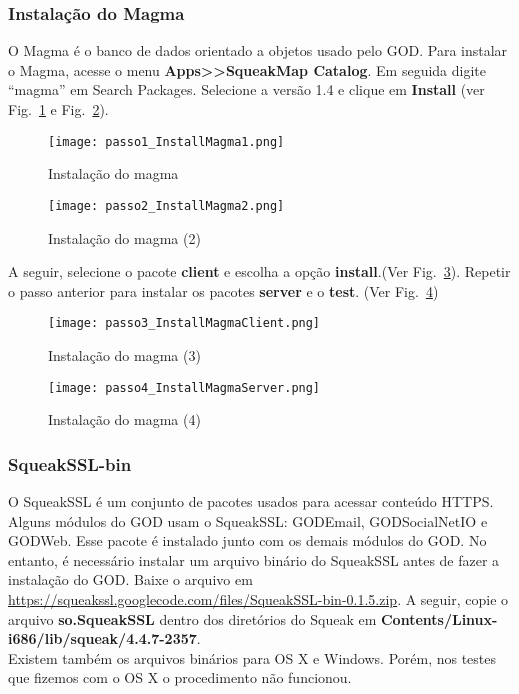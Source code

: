 \subsubsection{Instalação do Magma}
O Magma é o banco de dados orientado a objetos usado pelo GOD. Para instalar o Magma, acesse o menu \textbf{Apps>>SqueakMap Catalog}. Em seguida digite ``magma'' em Search Packages. Selecione a versão 1.4 e clique em \textbf{Install} (ver Fig.~\ref{fig:passo1_InstallMagma1} e Fig.~\ref{fig:passo2_InstallMagma2}).

\begin{figure}[!htb]
\centering
\texttt{[image: passo1\_InstallMagma1.png]}
\caption{Instalação do magma}
\label{fig:passo1_InstallMagma1}
\end{figure}

\begin{figure}[!htb]
\centering
\texttt{[image: passo2\_InstallMagma2.png]}
\caption{Instalação do magma (2)}
\label{fig:passo2_InstallMagma2}
\end{figure}

A seguir, selecione o pacote \textbf{client} e escolha a opção \textbf{install}.(Ver Fig.~\ref{fig:passo3_InstallMagmaClient}). Repetir o passo anterior para instalar os pacotes  \textbf{server} e o \textbf{test}. (Ver Fig.~\ref{fig:passo4_InstallMagmaServer})

\begin{figure}[!htb]
\centering
\texttt{[image: passo3\_InstallMagmaClient.png]}
\caption{Instalação do magma (3)}
\label{fig:passo3_InstallMagmaClient}
\end{figure}

\begin{figure}[!htb]
\centering
\texttt{[image: passo4\_InstallMagmaServer.png]}
\caption{Instalação do magma (4)}
\label{fig:passo4_InstallMagmaServer}
\end{figure}


\subsubsection{SqueakSSL-bin}
O SqueakSSL é um conjunto de pacotes usados para acessar conteúdo HTTPS. Alguns módulos do GOD usam o SqueakSSL: GODEmail, GODSocialNetIO e GODWeb.
Esse pacote é instalado junto com os demais módulos do GOD. No entanto, é necessário instalar um arquivo binário do SqueakSSL antes de fazer a instalação do GOD.
Baixe o arquivo em \url{https://squeakssl.googlecode.com/files/SqueakSSL-bin-0.1.5.zip}. A seguir, copie o arquivo \textbf{so.SqueakSSL} dentro dos diretórios do Squeak em 
\textbf{Contents/Linux-i686/lib/squeak/4.4.7-2357}. \\
Existem também os arquivos binários para OS X e Windows. Porém, nos testes que fizemos com o OS X o procedimento não funcionou.

